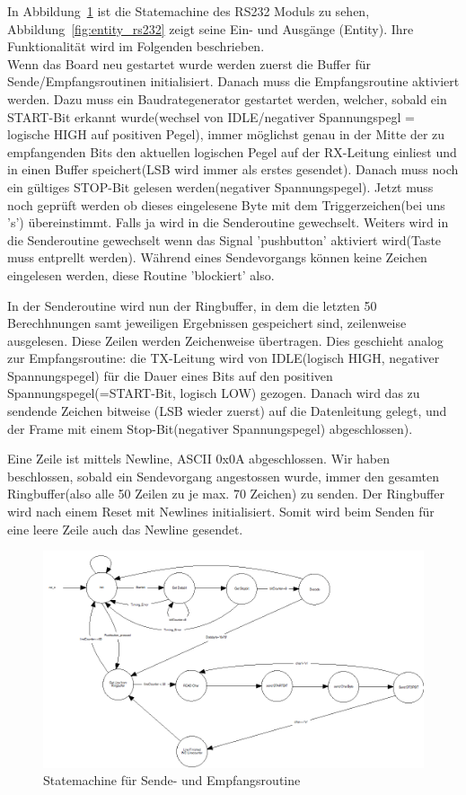 In Abbildung~\ref{fig:rs232statemachine} ist die Statemachine des RS232 Moduls zu sehen, Abbildung~\ref{fig:entity_rs232} zeigt seine Ein- und Ausgänge (Entity). Ihre Funktionalität wird im Folgenden beschrieben. \\
Wenn das Board neu gestartet wurde werden zuerst die Buffer für Sende/Empfangsroutinen initialisiert. Danach muss die Empfangsroutine aktiviert werden. Dazu muss ein Baudrategenerator gestartet werden, welcher, sobald ein START-Bit erkannt wurde(wechsel von IDLE/negativer Spannungspegl = logische HIGH auf positiven Pegel), immer möglichst genau in der Mitte der zu empfangenden Bits den aktuellen logischen Pegel auf der RX-Leitung  einliest und in einen Buffer speichert(LSB wird immer als erstes gesendet). Danach muss noch ein gültiges STOP-Bit gelesen werden(negativer Spannungspegel). Jetzt muss noch geprüft werden ob dieses eingelesene Byte mit dem Triggerzeichen(bei uns 's') übereinstimmt. Falls ja wird in die Senderoutine gewechselt. Weiters wird in die Senderoutine gewechselt wenn das Signal 'pushbutton' aktiviert wird(Taste muss entprellt werden). Während eines Sendevorgangs können keine Zeichen eingelesen werden, diese Routine 'blockiert' also.

In der Senderoutine wird nun der Ringbuffer, in dem die letzten 50 Berechhnungen samt jeweiligen Ergebnissen gespeichert sind, zeilenweise ausgelesen. Diese Zeilen werden Zeichenweise übertragen. Dies geschieht analog zur Empfangsroutine: die TX-Leitung wird von IDLE(logisch HIGH, negativer Spannungspegel) für die Dauer eines Bits auf den positiven Spannungspegel(=START-Bit, logisch LOW) gezogen. Danach wird das zu sendende Zeichen bitweise (LSB wieder zuerst) auf die Datenleitung gelegt, und der Frame mit einem Stop-Bit(negativer Spannungspegel) abgeschlossen). 

Eine Zeile ist mittels Newline, ASCII 0x0A abgeschlossen. Wir haben beschlossen, sobald ein Sendevorgang angestossen wurde, immer den gesamten Ringbuffer(also alle 50 Zeilen zu je max. 70 Zeichen) zu senden. Der Ringbuffer wird nach einem Reset mit Newlines initialisiert. Somit wird beim Senden für eine leere Zeile auch das Newline gesendet. 

\begin{figure}[!ht]
	\centering
	\includegraphics[scale=0.3]{figures/rs232SM.png} 
	\caption{Statemachine für Sende- und Empfangsroutine}
	\label{fig:rs232statemachine}
\end{figure}

